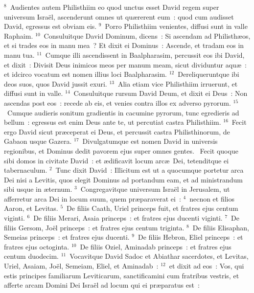 ${}^{8}$~Audientes autem Philisthiim eo quod unctus esset David regem super universum Isra\"el, ascenderunt omnes ut qu\ae rerent eum~: quod cum audisset David, egressus est obviam eis.
${}^{9}$~Porro Philisthiim venientes, diffusi sunt in valle Raphaim.
${}^{10}$~Consuluitque David Dominum, dicens~: Si ascendam ad Philisth\ae os, et si trades eos in manu mea~? Et dixit ei Dominus~: Ascende, et tradam eos in manu tua.
${}^{11}$~Cumque illi ascendissent in Baalpharasim, percussit eos ibi David, et dixit~: Divisit Deus inimicos meos per manum meam, sicut dividuntur aqu\ae~: et idcirco vocatum est nomen illius loci Baalpharasim.
${}^{12}$~Dereliqueruntque ibi deos suos, quos David jussit exuri.
${}^{13}$~Alia etiam vice Philisthiim irruerunt, et diffusi sunt in valle.
${}^{14}$~Consuluitque rursum David Deum, et dixit ei Deus~: Non ascendas post eos~: recede ab eis, et venies contra illos ex adverso pyrorum.
${}^{15}$~Cumque audieris sonitum gradientis in cacumine pyrorum, tunc egredieris ad bellum~: egressus est enim Deus ante te, ut percutiat castra Philisthiim.
${}^{16}$~Fecit ergo David sicut pr\ae ceperat ei Deus, et percussit castra Philisthinorum, de Gabaon usque Gazera.
${}^{17}$~Divulgatumque est nomen David in universis regionibus, et Dominus dedit pavorem ejus super omnes gentes.
~\lettrine[lines=10,image=true,loversize=0.05,lraise=-0.03]{F}{}ecit quoque sibi domos in civitate David~: et \ae dificavit locum arc\ae\ Dei, tetenditque ei tabernaculum.
${}^{2}$~Tunc dixit David~: Illicitum est ut a quocumque portetur arca Dei nisi a Levitis, quos elegit Dominus ad portandum eam, et ad ministrandum sibi usque in \ae ternum.
${}^{3}$~Congregavitque universum Isra\"el in Jerusalem, ut afferretur arca Dei in locum suum, quem pr\ae paraverat ei~:
${}^{4}$~necnon et filios Aaron, et Levitas.
${}^{5}$~De filiis Caath, Uriel princeps fuit, et fratres ejus centum viginti.
${}^{6}$~De filiis Merari, Asaia princeps~: et fratres ejus ducenti viginti.
${}^{7}$~De filiis Gersom, Jo\"el princeps~: et fratres ejus centum triginta.
${}^{8}$~De filiis Elisaphan, Semeias princeps~: et fratres ejus ducenti.
${}^{9}$~De filiis Hebron, Eliel princeps~: et fratres ejus octoginta.
${}^{10}$~De filiis Oziel, Aminadab princeps~: et fratres ejus centum duodecim.
${}^{11}$~Vocavitque David Sadoc et Abiathar sacerdotes, et Levitas, Uriel, Asaiam, Jo\"el, Semeiam, Eliel, et Aminadab~:
${}^{12}$~et dixit ad eos~: Vos, qui estis principes familiarum Leviticarum, sanctificamini cum fratribus vestris, et afferte arcam Domini Dei Isra\"el ad locum qui ei pr\ae paratus est~:
